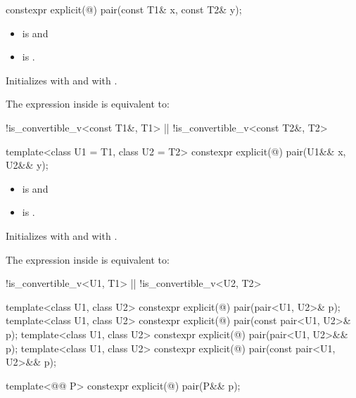 \documentclass{wg21}
\begin{document}
%
\begin{itemdecl}
    constexpr explicit(@\seebelow@) pair(const T1& x, const T2& y);
\end{itemdecl}

\begin{itemdescr}
    \pnum
    \constraints
    \begin{itemize}
        \item {} is  and
        \item {} is .
    \end{itemize}

    \pnum
    \effects
    Initializes  with  and  with .

    \pnum
    \remarks
    The expression inside  is equivalent to:
    \begin{codeblock}
        !is_convertible_v<const T1&, T1> || !is_convertible_v<const T2&, T2>
    \end{codeblock}
\end{itemdescr}

%
\begin{itemdecl}
    template<class U1 = T1, class U2 = T2> constexpr explicit(@\seebelow@) pair(U1&& x, U2&& y);
\end{itemdecl}

\begin{itemdescr}
    \pnum
    \constraints
    \begin{itemize}
        \item {} is  and
        \item {} is .
    \end{itemize}

    \pnum
    \effects
    Initializes  with
     and 
    with .

    \pnum
    \remarks
    The expression inside  is equivalent to:
    \begin{codeblock}
        !is_convertible_v<U1, T1> || !is_convertible_v<U2, T2>
    \end{codeblock}
\end{itemdescr}

%
\begin{itemdecl}
    template<class U1, class U2> constexpr explicit(@\seebelow@) pair(pair<U1, U2>& p);
    template<class U1, class U2> constexpr explicit(@\seebelow@) pair(const pair<U1, U2>& p);
    template<class U1, class U2> constexpr explicit(@\seebelow@) pair(pair<U1, U2>&& p);
    template<class U1, class U2> constexpr explicit(@\seebelow@) pair(const pair<U1, U2>&& p); \end{itemdecl}\begin{addedblock}\begin{itemdecl}
    template<@@ P> constexpr explicit(@\seebelow@) pair(P&& p);\end{itemdecl}
\end{addedblock}
\end{document}

